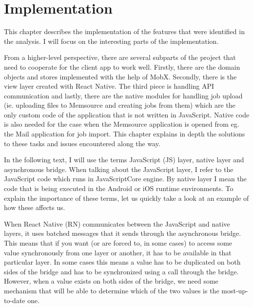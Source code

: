 \chapter{Implementation}

This chapter describes the implementation of the features that were identified in the analysis. I will focus on the interesting parts of the implementation.

From a higher-level perspective, there are several subparts of the project that need to cooperate for the client app to work well. Firstly, there are the domain objects and stores implemented with the help of MobX. Secondly, there is the view layer created with React Native. The third piece is handling API communication and lastly, there are the native modules for handling job upload (ie. uploading files to Memsource and creating jobs from them) which are the only custom code of the application that is not written in JavaScript. Native code is also needed for the case when the Memsource application is opened from eg. the Mail application for job import. This chapter explains in depth the solutions to these tasks and issues encountered along the way.


In the following text, I will use the terms JavaScript (JS) layer, native layer and asynchronous bridge. When talking about the JavaScript layer, I refer to the JavaScript code which runs in JavaScriptCore engine. By native layer I mean the code that is being executed in the Android or iOS runtime environments. To explain the importance of these terms, let us quickly take a look at an example of how these affects us.

When React Native (RN) communicates between the JavaScript and native layers, it uses batched messages that it sends through the asynchronous bridge. This means that if you want (or are forced to, in some cases) to access some value synchronously from one layer or another, it has to be available in that particular layer. In some cases this means a value has to be duplicated on both sides of the bridge and has to be synchronized using a call through the bridge. However, when a value exists on both sides of the bridge, we need some mechanism that will be able to determine which of the two values is the most-up-to-date one. 

